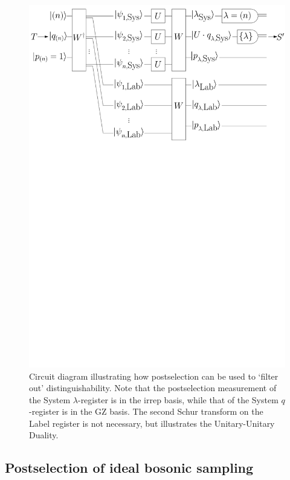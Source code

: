 \begin{figure}
\includegraphics[width=\linewidth]{noisy_circuit/post_circuit}
\caption[Circuit diagram illustrating how postselection can be used to `filter out' distinguishability]{Circuit diagram illustrating how postselection can be used to `filter out' distinguishability.
Note that the postselection measurement of the System $\lambda$-register is in the irrep basis, while that of the System $q$-register is in the GZ basis.
The second Schur transform on the Label register is not necessary, but illustrates the Unitary-Unitary Duality.}
\label{fig:noisy-bs-rep}
\end{figure}


\subsection{Postselection of ideal bosonic sampling}
\label{sec:post-bs}


